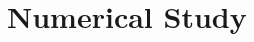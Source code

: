 \documentclass[11pt]{article}
\begin{document}

 



\vspace{-0.05in}
\section{Numerical Study}\label{sec:experiment}
\vspace{-0.05in}
\end{document}
